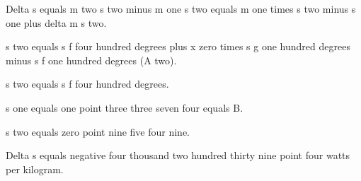 Delta s equals m two s two minus m one s two equals m one times s two minus s one plus delta m s two.

s two equals s f four hundred degrees plus x zero times s g one hundred degrees minus s f one hundred degrees (A two).

s two equals s f four hundred degrees.

s one equals one point three three seven four equals B.

s two equals zero point nine five four nine.

Delta s equals negative four thousand two hundred thirty nine point four watts per kilogram.